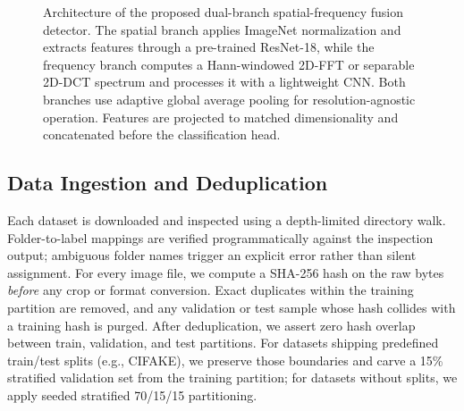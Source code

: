 \documentclass[conference]{IEEEtran}
\begin{document}
\begin{figure}[!t]
\caption{Architecture of the proposed dual-branch spatial-frequency fusion detector. The spatial branch applies ImageNet normalization and extracts features through a pre-trained ResNet-18, while the frequency branch computes a Hann-windowed 2D-FFT or separable 2D-DCT spectrum and processes it with a lightweight CNN. Both branches use adaptive global average pooling for resolution-agnostic operation. Features are projected to matched dimensionality and concatenated before the classification head.}
\label{fig:architecture}
\end{figure}

\subsection{Data Ingestion and Deduplication}

Each dataset is downloaded and inspected using a depth-limited directory walk. Folder-to-label mappings are verified programmatically against the inspection output; ambiguous folder names trigger an explicit error rather than silent assignment. For every image file, we compute a SHA-256 hash on the raw bytes \emph{before} any crop or format conversion. Exact duplicates within the training partition are removed, and any validation or test sample whose hash collides with a training hash is purged. After deduplication, we assert zero hash overlap between train, validation, and test partitions. For datasets shipping predefined train/test splits (e.g., CIFAKE), we preserve those boundaries and carve a 15\% stratified validation set from the training partition; for datasets without splits, we apply seeded stratified 70/15/15 partitioning.
\end{document}
